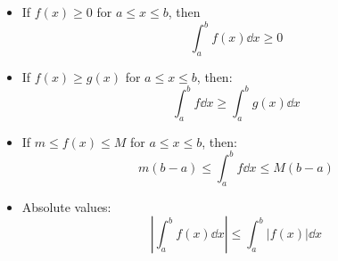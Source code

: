 \begin{itemize}
\begin{itemize}
    \item If $f(x)\ge 0$ for $a\le x\le b$, then
    \begin{equation}
        \int_a^b f(x)\dd{x} \ge 0
        \label{eq:}
    \end{equation}
    \item If $f(x) \ge g(x)$ for $a\le x\le b$, then:
    \begin{equation}
        \int_a^b f \dd{x} \ge \int_a^b g(x) \dd{x}
        \label{eq:}
    \end{equation}
    \item If $m\le f(x) \le M$ for $a\le x\le b$, then:
    \begin{equation}
        m(b-a) \le \int_a^b f\dd{x} \le M(b-a)
        \label{eq:}
    \end{equation}
    \item Absolute values:
    \begin{equation}
        \left|\int_a^b f(x) \dd{x}\right| \le \int_a^b |f(x)| \dd{x}
    \end{equation}
    
\end{itemize}
    
\end{itemize}